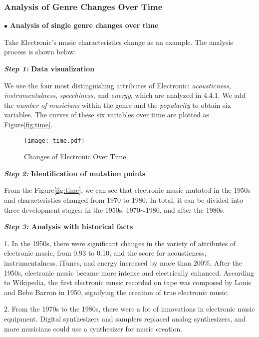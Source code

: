 \documentclass[12pt]{article}  %
\begin{document}
\vspace{-0.3cm}
\subsubsection{Analysis of Genre Changes Over Time}
\vspace{-0.2cm}
$\bullet$ \textbf{Analysis of single genre changes over time}

Take Electronic's music characteristics change as an example. The analysis process is shown below:

\textbf{\emph{Step 1:}} \textbf{Data visualization}

We use the four most distinguishing attributes of Electronic: \emph{acousticness}, \emph{instrumentalness}, \emph{speechiness}, and \emph{energy}, which are analyzed in 4.4.1. We add the \emph{number of musicians} within the genre and the \emph{popularity} to obtain six variables. The curves of these six variables over time are plotted as Figure\eqref{fig:time}.

\begin{figure}[htbp]
	\centering
	\texttt{[image: time.pdf]}
	\caption{Changes of Electronic Over Time}\label{fig:time}
\end{figure}
\vspace{-0.6cm}
\textbf{\emph{Step 2:}} \textbf{Identification of mutation points}

From the Figure\eqref{fig:time}, we can see that electronic music mutated in the 1950s and characteristics changed from 1970 to 1980. In total, it can be divided into three development stages: in the 1950s, 1970$\sim$1980, and after the 1980s.

\textbf{\emph{Step 3:} Analysis with historical facts}

1. In the 1950s, there were significant changes in the variety of attributes of electronic music, from 0.93 to 0.10, and the score for acousticness, instrumentalness, iTunes, and energy increased by more than 200\%. After the 1950s, electronic music became more intense and electrically enhanced. According to Wikipedia\cite{6}, the first electronic music recorded on tape was composed by Louis and Bebe Barron in 1950, signifying the creation of true electronic music.

2. From the 1970s to the 1980s, there were a lot of innovations in electronic music equipment. Digital synthesizers and samplers replaced analog synthesizers, and more musicians could use a synthesizer for music creation.
\end{document}
